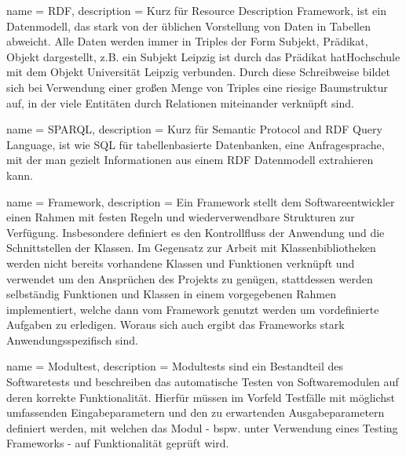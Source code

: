      {
        name = RDF,
        description = {
            Kurz für Resource Description Framework, ist ein Datenmodell, 
            das stark von der üblichen Vorstellung von Daten in Tabellen 
            abweicht. Alle Daten werden immer in Triples der Form Subjekt,
            Prädikat, Objekt dargestellt, z.B. ein Subjekt Leipzig ist durch 
            das Prädikat hatHochschule mit
            dem Objekt Universität Leipzig verbunden. Durch diese 
            Schreibweise bildet sich bei Verwendung einer großen Menge von 
            Triples eine riesige Baumstruktur auf, in der viele Entitäten 
            durch Relationen miteinander verknüpft sind.
        }
    }

     {
        name = SPARQL,
        description = {
            Kurz für Semantic Protocol and RDF Query Language, ist wie SQL für 
            tabellenbasierte Datenbanken, eine Anfragesprache, mit der man gezielt 
            Informationen aus einem RDF Datenmodell extrahieren kann.
        }
    }


     {
        name = Framework,
        description = {
            Ein Framework stellt dem Softwareentwickler einen Rahmen mit festen Regeln und 
            wiederverwendbare Strukturen zur Verfügung. Insbesondere definiert es den 
            Kontrollfluss der Anwendung und die Schnittstellen der Klassen. Im Gegensatz 
            zur Arbeit mit Klassenbibliotheken werden nicht bereits vorhandene Klassen und 
            Funktionen verknüpft und verwendet um den Ansprüchen des Projekts zu genügen, 
            stattdessen werden selbständig Funktionen und Klassen in einem vorgegebenen 
            Rahmen implementiert, welche dann vom Framework genutzt werden um 
            vordefinierte Aufgaben zu erledigen. Woraus sich auch ergibt das Frameworks 
            stark Anwendungsspezifisch sind.
        }
    }


     {
        name = Modultest,
        description = {
            Modultests sind ein Bestandteil des Softwaretests und beschreiben das 
            automatische Testen von Softwaremodulen auf deren korrekte Funktionalität. 
            Hierfür müssen im Vorfeld Testfälle mit möglichst umfassenden 
            Eingabeparametern und den zu erwartenden Ausgabeparametern definiert werden, 
            mit welchen das Modul - bspw. unter Verwendung eines Testing Frameworks -
            auf Funktionalität geprüft wird.    
        }
    }


